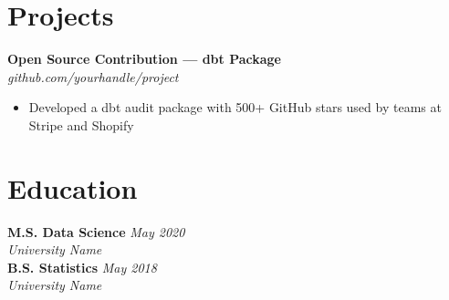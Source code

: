 \documentclass[11pt,a4paper]{article}
\begin{document}
\section{Projects}
\textbf{Open Source Contribution — dbt Package} \\
\textit{github.com/yourhandle/project}
\begin{itemize}[leftmargin=*, noitemsep, topsep=2pt]
  \item Developed a dbt audit package with 500+ GitHub stars used by teams at Stripe and Shopify
\end{itemize}

\section{Education}
\textbf{M.S. Data Science} \hfill \textit{May 2020} \\
\textit{University Name} \\
\textbf{B.S. Statistics} \hfill \textit{May 2018} \\
\textit{University Name}
\end{document}

